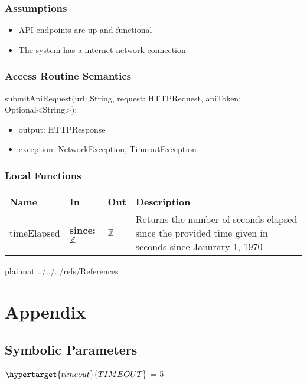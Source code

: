 \documentclass[12pt, titlepage]{article}
\begin{document}
\subsubsection{Assumptions}
\begin{itemize}
  \item API endpoints are up and functional
  \item The system has a internet network connection
\end{itemize}
\subsubsection{Access Routine Semantics}

\noindent submitApiRequest(url: String, request: HTTPRequest, apiToken:
Optional\textless String\textgreater):
\begin{itemize}
  \item output: HTTPResponse
  \item exception: NetworkException, TimeoutException
\end{itemize}

\subsubsection{Local Functions}

\begin{center}
  \begin{tabular}{>{\raggedright}p{3cm} >{\raggedright}p{5cm}
    >{\raggedright}p{4cm} p{4cm}}
    \hline
    \textbf{Name} & \textbf{In} & \textbf{Out} & \textbf{Description} \\
    \hline
    timeElapsed & \textbf{since:} $\mathbb{Z}$ & $\mathbb{Z}$ & Returns the
    number of seconds elapsed since the provided time given in seconds since
    Janurary 1, 1970 \\
    \hline
  \end{tabular}
\end{center}

\newpage

 {plainnat}
 {../../../refs/References}

\newpage

\section{Appendix} \label{Appendix}

\subsection{Symbolic Parameters}
$\hypertarget{timeout}{TIMEOUT}$ = 5\\
\end{document}
